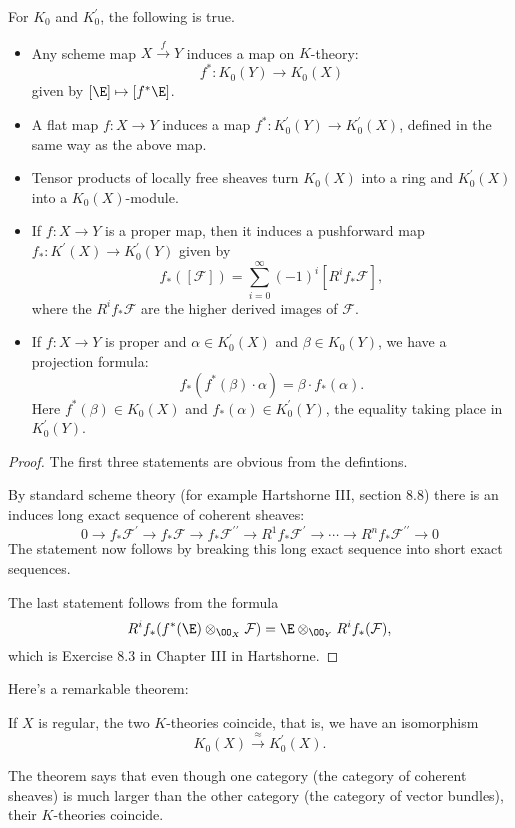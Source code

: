 \documentclass[11pt, english]{article}
\begin{document}
\begin{lemma}
For $K_0$ and $K_0^\prime$, the following is true. 
\begin{itemize}
\item
Any scheme map $X \xrightarrow{f} Y$ induces a map on $K$-theory:
\[
f^*:K_0(Y) \to K_0(X)
\]
given by $[\E] \mapsto [f^*\E]$.
\item
A flat map $f:X \to Y$ induces a map $f^*:K_0^\prime(Y) \to K_0^\prime(X)$, defined in the same way as the above map.
\item
Tensor products of locally free sheaves turn $K_0(X)$ into a ring and $K_0^\prime(X)$ into a $K_0(X)$-module.
\item 
If $f:X \to Y$ is a proper map, then it induces a pushforward map $f_*:K^\prime(X) \to K_0^\prime(Y)$ given by
\[
f_*([\mathcal F]) = \sum_{i=0}^\infty (-1)^i [R^if_*\mathcal F],
\]
where the $R^if_*\mathcal F$ are the higher derived images of $\mathcal F$.
\item
If $f:X \to Y$ is proper and $\alpha \in K_0^\prime (X)$ and $\beta \in K_0(Y)$, we have a projection formula:
\[
f_*(f^*(\beta) \cdot \alpha) = \beta \cdot f_*(\alpha).
\]
Here $f^*(\beta) \in K_0(X)$ and $f_*(\alpha) \in K_0^\prime(Y)$, the equality taking place in $K_0^\prime(Y)$.
\end{itemize}
\end{lemma}
\begin{proof}
The first three statements are obvious from the defintions.

By standard scheme theory (for example Hartshorne III, section 8.8) there is an induces long exact sequence of coherent sheaves:
\[
0 \to f_*\mathcal F^\prime \to f_*\mathcal F \to f_*\mathcal F^{\prime \prime} \to R^1f_*\mathcal F^\prime \to \cdots \to R^nf_*\mathcal{F}^{\prime \prime} \to 0
\]
The statement now follows by breaking this long exact sequence into short exact sequences.

The last statement follows from the formula \[R^if_*(f^*(\E) \otimes_{\OO_X} \mathcal F) = \E \otimes_{\OO_Y} R^if_*(\mathcal F),\] which is Exercise 8.3 in Chapter III in Hartshorne.
\end{proof}

Here's a remarkable theorem:
\begin{thm}
If $X$ is regular, the two $K$-theories coincide, that is, we have an isomorphism
\[
K_0(X) \xrightarrow{\approx} K_0^\prime(X).
\]
\end{thm}
The theorem says that even though one category (the category of coherent sheaves) is much larger than the other category (the category of vector bundles), their $K$-theories coincide.
\end{document}
